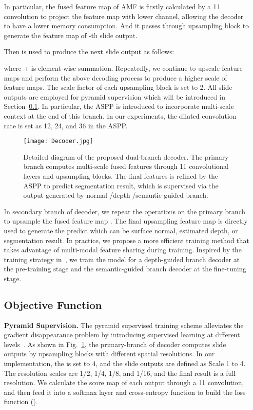 \documentclass[10pt,twocolumn,letterpaper]{article}
\begin{document}
In particular, the fused feature map  of AMF is firstly calculated by a 11 convolution  to project the feature map  with lower channel, allowing the decoder to have a lower memory consumption. And it passes through upsampling block  to generate the feature map  of -th slide output.

\label{eq5}
Then  is used to produce the next slide output as follows:

where {\textcircled{\scriptsize{+}}} is element-wise summation. Repeatedly, we continue to upscale feature maps and perform the above decoding process to produce a higher scale of feature maps. The scale factor of each upsampling block is set to 2. All slide outputs are employed for pyramid supervision which will be introduced in Section~\ref{sec:supervision}. In particular, the ASPP is introduced to incorporate multi-scale context at the end of this branch. In our experiments, the dilated convolution rate is set as 12, 24, and 36 in the ASPP.
\begin{figure}[t]
	\centering
	\texttt{[image: Decoder.jpg]}
	\caption{Detailed diagram of the proposed dual-branch decoder. The primary branch computes multi-scale fused features through 11 convolutional layers and upsampling blocks. The final features is refined by the ASPP to predict segmentation result, which is supervised via the output generated by normal-/depth-/semantic-guided branch.}
	\label{Fig:decoder1}
\end{figure}

In secondary branch of decoder, we repeat the operations on the primary branch to upsample the fused feature map . The final upsampling feature map  is directly used to generate the predict which can be surface normal, estimated depth, or segmentation result. In practice, we propose a more efficient training method that takes advantage of multi-modal feature sharing during training. Inspired by the training strategy in~\cite{Girshick:CVPR2014}, we train the model for a depth-guided branch decoder at the pre-training stage and the semantic-guided branch decoder at the fine-tuning stage.

\subsection{Objective Function}\label{sec:supervision}
\noindent
\textbf{Pyramid Supervision.}
The pyramid supervised training scheme alleviates the gradient disappearance problem by introducing supervised learning at different levels~\cite{Jiang:arXiv18}. As shown in Fig.~\ref{Fig:decoder1}, the primary-branch of decoder computes  slide outputs by upsampling blocks with different spatial resolutions. In our implementation, the  is set to 4, and the slide outputs are defined as Scale 1 to 4. The resolution scales are 1/2, 1/4, 1/8, and 1/16, and the final result is a full resolution. We calculate the score map of each output through a 11 convolution, and then feed it into a softmax layer and cross-entropy function to build the loss function  ().
\end{document}
